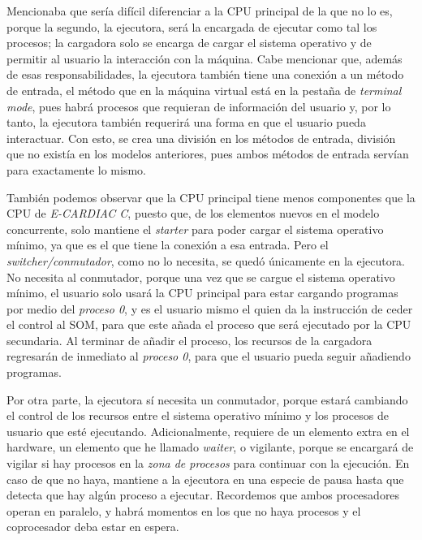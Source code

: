 \documentclass[letterpaper,12pt,oneside]{book}
\begin{document}
        Mencionaba que sería difícil  diferenciar a la CPU principal de la que no lo es, porque la
		segundo, la ejecutora, será la encargada de ejecutar como tal los procesos; la cargadora solo se encarga de cargar el sistema operativo y de 
		permitir al usuario
		la interacción con la máquina. Cabe mencionar
		que, además de esas responsabilidades, la ejecutora también tiene una conexión a un método de entrada, el método que en la máquina
		virtual está en
		la pestaña de \textit{terminal mode}, pues habrá procesos que requieran de información del usuario 
		y, por lo tanto, la ejecutora también requerirá
		una forma en que el usuario pueda interactuar. Con esto, se crea una división en los métodos de entrada, división que no existía
		en los modelos anteriores, pues ambos métodos de entrada servían para exactamente lo mismo.
		
		
		También podemos observar que la CPU principal tiene menos componentes que la CPU de \textit{E-CARDIAC C}, 
		puesto que, de los elementos nuevos en el modelo concurrente, solo mantiene el \textit{starter} para
		poder cargar el sistema operativo mínimo, ya que es el que tiene la conexión a esa entrada. Pero el \textit{switcher/conmutador}, como no lo 
		necesita, se quedó
		únicamente en la ejecutora. No necesita al conmutador, porque una vez que se cargue el sistema operativo mínimo, el usuario solo usará
		la CPU principal para estar cargando programas por medio del \textit{proceso 0}, 
		y es el usuario mismo el quien da la instrucción de ceder el control
		al SOM, para que este añada el proceso que será ejecutado por la CPU secundaria. Al terminar de añadir el proceso, los recursos de la cargadora 
		regresarán de inmediato al \textit{proceso 0}, para que el usuario
		pueda seguir añadiendo programas.
		
		Por otra parte, la ejecutora sí necesita un conmutador, porque estará cambiando el control de los recursos entre el sistema operativo mínimo
		y los procesos de usuario que esté ejecutando. Adicionalmente, requiere de un elemento extra en el hardware, un elemento que he llamado 
		\textit{waiter}, o vigilante, porque se encargará
		de vigilar si hay procesos en la \textit{zona de procesos} para continuar con la ejecución. En caso de que no haya, mantiene a la ejecutora
		en una 
		especie de	pausa hasta que detecta que hay algún proceso a ejecutar. Recordemos que ambos procesadores operan en paralelo,
		y habrá momentos en los que no haya procesos y el coprocesador deba estar en espera.
\end{document}
